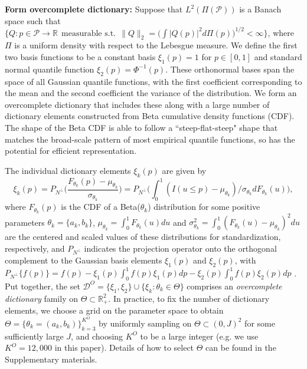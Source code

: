 \documentclass[11pt]{article}
\begin{document}
\textbf{Form overcomplete dictionary:}    Suppose that $L^2(\Pi(\mathcal{P}))$ is a Banach space such that $\{ Q: p \in \mathcal{P} \rightarrow \mathbb {R}~~ \text{measurable s.t.}~~ 
\|Q\|_2=\bigr ( \int |Q(p)|^2 d\Pi(p)  \bigl )^{1/2} < \infty \}$, where
$\Pi$ is a uniform density with respect to the Lebesgue measure. We define the first two basis functions to be a constant basis $\xi_1(p)=1$ for $p \in [0,1]$ and standard normal quantile function $\xi_2(p) = \Phi^{-1}(p)$.  These orthonormal bases span the space of all Gaussian quantile functions, with the first coefficient corresponding to the mean and the second coefficient the variance of the distribution.  
We form an overcomplete dictionary that includes these along with a large number of dictionary elements constructed from Beta cumulative density functions (CDF).  The shape of the Beta CDF is able to follow a 
``steep-flat-steep" shape that matches the broad-scale pattern of most empirical quantile functions, so has the potential for efficient representation.


The individual dictionary elements $\xi_k(p)$ are given by
 \begin{equation} \label{p5_phi}
\xi_k(p) =    P_{N^{\perp}} \biggr (    \frac{ F_{\theta_k}(p) -   \mu_{\theta_k} } { \sigma_{\theta_k} }  \biggl ) 
=  P_{N^{\perp}}  \biggr (  \int_{0}^{1} ( I(u \le p)  -\mu_{\theta_k})/\sigma_{\theta_k}dF_{\theta_k}(u)  \biggl ) , 
\end{equation}
where $F_{\theta_k}(p)$ is the CDF of a Beta($\theta_k$) distribution for some positive parameters $\theta_k=\{a_k, b_k\}$, $\mu_{\theta_k}= \int_{0}^1 F_{\theta_k}(u)  du$ and 
$\sigma_{\theta_k}^2= \int_{0}^1 (F_{\theta_k}(u)-\mu_{\theta_k})^2du$ are the centered   %
and scaled values of these distributions for standardization, respectively, 
and $P_{N^{\perp}}$
indicates the projection operator onto the orthogonal complement to the Gaussian basis elements $\xi_1(p)$ and $\xi_2(p)$, with $P_{N^{\perp}}\{f(p)\}= f(p) - \xi_1(p) \int_0^1 f(p) \xi_1(p) dp - \xi_2(p) \int_0^1 f(p) \xi_2(p) dp$ .  Put together, the set
$\mathcal{D}^{O}=\{ \xi_1, \xi_2 \} \cup \{  \xi_k:    \theta_k  \in \Theta \}$  comprises an {\it overcomplete dictionary}  family
  on $\Theta \subset \mathbb {R}_{+}^{2}$. 
  In practice, to fix the number of dictionary elements, we choose a grid on the parameter space to obtain $\Theta=\{ \theta_k= (a_k,b_k)  \}_{k=3}^{K^{O}}$ by uniformly sampling on 
 $\Theta \subset (0, J )^{2}$  for some sufficiently large $J$, 
and choosing $K^{O}$ to be a large integer (e.g. we use $K^{O}=12,000$ in this paper).
Details of how to select $\Theta$ can be found in the Supplementary materials. 
\end{document}
